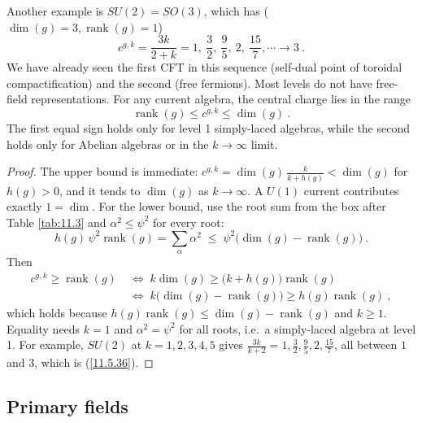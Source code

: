Another example is $SU(2)=SO(3)$, which has ($\operatorname{dim}(g)=3, \operatorname{rank}(g)=1$)
\begin{equation}
	c^{g,k}=\frac{3k}{2+k} = 1,\:\frac{3}{2},\:\frac{9}{5},\:2,\:\frac{15}{7},\cdots\to3 \:. \label{11.5.36}
\end{equation}
We have already seen the first CFT in this sequence (self-dual point of toroidal compactification) and the second (free fermions). Most levels do not have free-field representations. For any current algebra, the central charge lies in the range
\begin{equation}
	\operatorname{rank}(g)\leq c^{g,k} \leq \operatorname{dim}(g) \:. \label{11.5.37}
\end{equation}
The first equal sign holds only for level 1 simply-laced algebras, while the second holds only for Abelian algebras or in the $k\to\infty$ limit.
\begin{tcolorbox}[breakable]
	\begin{proof}
		The upper bound is immediate: $c^{g,k}=\operatorname{dim}(g)\,\frac{k}{k+h(g)}<\operatorname{dim}(g)$ for $h(g)>0$, and it tends to $\operatorname{dim}(g)$ as $k\to\infty$. A $U(1)$ current contributes exactly $1=\operatorname{dim}$. For the lower bound, use the root sum from the box after Table \ref{tab:11.3} and $\alpha^{2}\leq\psi^{2}$ for every root:
		\begin{equation*}
			h(g)\,\psi^{2}\operatorname{rank}(g)=\sum_{\alpha}\alpha^{2}\;\leq\;\psi^{2}\bigl(\operatorname{dim}(g)-\operatorname{rank}(g)\bigr)\:.
		\end{equation*}
		Then
		\begin{align*}
			c^{g,k}\geq\operatorname{rank}(g)
			\;&\Longleftrightarrow\; k\operatorname{dim}(g)\geq\bigl(k+h(g)\bigr)\operatorname{rank}(g)\\
			\;&\Longleftrightarrow\; k\bigl(\operatorname{dim}(g)-\operatorname{rank}(g)\bigr)\geq h(g)\operatorname{rank}(g)\:,
		\end{align*}
		which holds because $h(g)\operatorname{rank}(g)\leq\operatorname{dim}(g)-\operatorname{rank}(g)$ and $k\geq1$. Equality needs $k=1$ and $\alpha^{2}=\psi^{2}$ for all roots, i.e.\ a simply-laced algebra at level 1. For example, $SU(2)$ at $k=1,2,3,4,5$ gives $\frac{3k}{k+2}=1,\frac{3}{2},\frac{9}{5},2,\frac{15}{7}$, all between $1$ and $3$, which is (\ref{11.5.36}).
	\end{proof}
\end{tcolorbox}

\subsection*{Primary fields}

